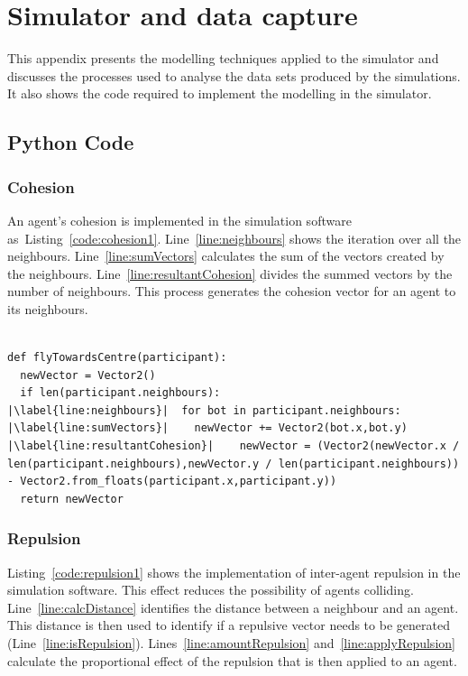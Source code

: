 \chapter{Simulator and data capture}\label{app5}

This appendix presents the modelling techniques applied to the simulator and discusses the processes used to analyse the data sets produced by the simulations. It also shows the code required to implement the modelling in the simulator.

\section{Python Code}\label{sim:PythonCode}

\subsection{Cohesion}\label{sim:code:Cohesion}
An agent's cohesion is implemented in the simulation software as~Listing~\ref{code:cohesion1}. Line~\ref{line:neighbours} shows the iteration over all the neighbours. Line~\ref{line:sumVectors} calculates the sum of the vectors created by the neighbours. Line~\ref{line:resultantCohesion} divides the summed vectors by the number of neighbours. This process generates the cohesion vector for an agent to its neighbours.

\lstset{language=Python,
basicstyle=\tiny,
numbers=left, 
numberstyle=\tiny,
captionpos=b,
frame=single,
breaklines=true,
caption=Cohesion code,
escapechar=|
} %
\begin{lstlisting}[label={code:cohesion1}]  % Start your code-block

def flyTowardsCentre(participant):
  newVector = Vector2()
  if len(participant.neighbours):
|\label{line:neighbours}|  for bot in participant.neighbours:
|\label{line:sumVectors}|    newVector += Vector2(bot.x,bot.y)
|\label{line:resultantCohesion}|    newVector = (Vector2(newVector.x / len(participant.neighbours),newVector.y / len(participant.neighbours)) - Vector2.from_floats(participant.x,participant.y))
  return newVector
\end{lstlisting}

\subsection{Repulsion}\label{sim:code:Repulsion}
Listing~\ref{code:repulsion1} shows the implementation of inter-agent repulsion in the simulation software. This effect reduces the possibility of agents colliding. Line~\ref{line:calcDistance} identifies the distance between a neighbour and an agent. This distance is then used to identify if a repulsive vector needs to be generated (Line~\ref{line:isRepulsion}). Lines~\ref{line:amountRepulsion} and~\ref{line:applyRepulsion} calculate the proportional effect of the repulsion that is then applied to an agent.

